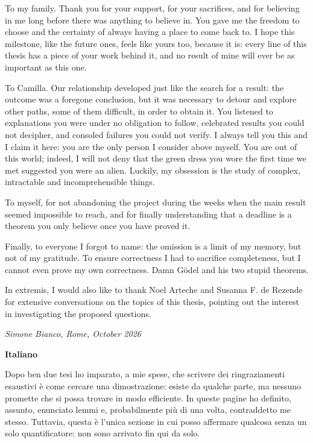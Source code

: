 To my family. Thank you for your support, for your sacrifices, and for believing in me long before there was anything to believe in. You gave me the freedom to choose and the certainty of always having a place to come back to. I hope this milestone, like the future ones, feels like yours too, because it is: every line of this thesis has a piece of your work behind it, and no result of mine will ever be as important as this one.

To Camilla. Our relationship developed just like the search for a result: the outcome was a foregone conclusion, but it was necessary to detour and explore other paths, some of them difficult, in order to obtain it. You listened to explanations you were under no obligation to follow, celebrated results you could not decipher, and consoled failures you could not verify. I always tell you this and I claim it here: you are the only person I consider above myself. You are out of this world; indeed, I will not deny that the green dress you wore the first time we met suggested you were an alien. Luckily, my obsession is the study of complex, intractable and incomprehensible things.

To myself, for not abandoning the project during the weeks when the main result seemed impossible to reach, and for finally understanding that a deadline is a theorem you only believe once you have proved it.

Finally, to everyone I forgot to name: the omission is a limit of my memory, but not of my gratitude. To ensure correctness I had to sacrifice completeness, but I cannot even prove my own correctness. Damn Gödel and his two stupid theorems.

In extremis, I would also like to thank Noel Arteche and Susanna F. de Rezende for extensive conversations on the topics of this thesis, pointing out the interest in investigating the proposed questions.

\noindent
\textit{Simone Bianco, Rome, October 2026}

\quad

\noindent
\textbf{Italiano}

\noindent
Dopo ben due tesi ho imparato, a mie spese, che scrivere dei ringraziamenti esaustivi è come cercare una dimostrazione: esiste da qualche parte, ma nessuno promette che si possa trovare in modo efficiente. In queste pagine ho definito, assunto, enunciato lemmi e, probabilmente più di una volta, contraddetto me stesso. Tuttavia, questa è l'unica sezione in cui posso affermare qualcosa senza un solo quantificatore: non sono arrivato fin qui da solo.

